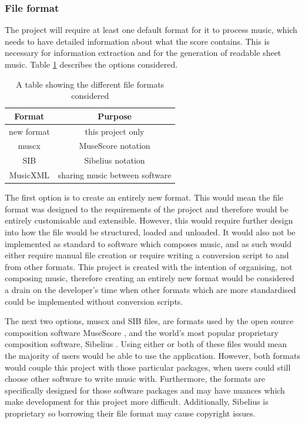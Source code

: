 \subsubsection{File format}
The project will require at least one default format for it to process music, which needs to have detailed information about what the score contains. This is necessary for information extraction and for the generation of readable sheet music. Table \ref{table:formats} describes the options considered.

\begin{table}[H]
\centering
\begin{tabular}{| c | c | } \hline
  {\textbf{Format}} & {\textbf{Purpose}} \\ \hline
  new format & this project only \\ \hline
  muscx & MuseScore notation \\ \hline
  SIB & Sibelius notation \\ \hline
  MusicXML & sharing music between software \\ \hline
\end{tabular}
\caption{A table showing the different file formats considered}
\label{table:formats}
\end{table}
The first option is to create an entirely new format. This would mean the file format was designed to the requirements of the project and therefore would be entirely customisable and extensible. However, this would require further design into how the file would be structured, loaded and unloaded.
 It would also not be implemented as standard to software which composes music, and as such would either require manual file creation or require writing a conversion script to and from other formats. This project is created with the intention of organising, not composing music, therefore creating an entirely new format would be considered a drain on the developer's time when other formats which are more standardised could be implemented without conversion scripts.

The next two options, muscx and SIB files, are formats used by the open source composition software MuseScore \parencite{MuseTour}, and the world's most popular proprietary composition software, Sibelius \parencite{avid}. Using either or both of these files would mean the majority of users would be able to use the application. 
However, both formats would couple this project with those particular packages, when users could still choose other software to write music with. Furthermore, the formats are specifically designed for those software packages and may have nuances which make development for this project more difficult. Additionally, Sibelius is proprietary so borrowing their file format may cause copyright issues.


